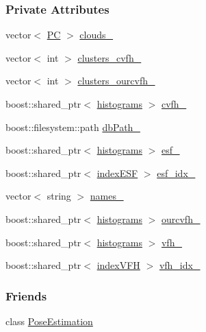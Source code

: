 \subsubsection*{Private Attributes}
\begin{DoxyCompactItemize}
\item 
vector$<$ \hyperlink{group__Definitions_ga62eb21fcfa3189c5de50fb62a2a7a79e}{P\-C} $>$ \hyperlink{classPoseDB_a6c324c00cf5ce2d6370567891170ba68}{clouds\-\_\-}
\item 
vector$<$ int $>$ \hyperlink{classPoseDB_a769672c08a62f8f6fc4fcf5f192e10cd}{clusters\-\_\-cvfh\-\_\-}
\item 
vector$<$ int $>$ \hyperlink{classPoseDB_acad0fbd4acff036f4dad3bfe796d2f1d}{clusters\-\_\-ourcvfh\-\_\-}
\item 
boost\-::shared\-\_\-ptr$<$ \hyperlink{group__Definitions_ga136493056b2eaf642f660e6a45a62991}{histograms} $>$ \hyperlink{classPoseDB_a64f15c76d07faed58d44fa73fe8081f2}{cvfh\-\_\-}
\item 
boost\-::filesystem\-::path \hyperlink{classPoseDB_ad1e3c1001be37bde48faa6502370494b}{db\-Path\-\_\-}
\item 
boost\-::shared\-\_\-ptr$<$ \hyperlink{group__Definitions_ga136493056b2eaf642f660e6a45a62991}{histograms} $>$ \hyperlink{classPoseDB_a658d2785a7e8f59466993864addbeb20}{esf\-\_\-}
\item 
boost\-::shared\-\_\-ptr$<$ \hyperlink{group__Definitions_ga3f45d3216269cf676ea864ae3bfcc446}{index\-E\-S\-F} $>$ \hyperlink{classPoseDB_ae19c149b38112855a937364747edefd5}{esf\-\_\-idx\-\_\-}
\item 
vector$<$ string $>$ \hyperlink{classPoseDB_a2870a93aa6304528109ce29204c95f51}{names\-\_\-}
\item 
boost\-::shared\-\_\-ptr$<$ \hyperlink{group__Definitions_ga136493056b2eaf642f660e6a45a62991}{histograms} $>$ \hyperlink{classPoseDB_a1a7c85d9cb1c33e27abe73f7d61aef6d}{ourcvfh\-\_\-}
\item 
boost\-::shared\-\_\-ptr$<$ \hyperlink{group__Definitions_ga136493056b2eaf642f660e6a45a62991}{histograms} $>$ \hyperlink{classPoseDB_ab0d34fd8b0fc5f74e2b7fc5261fdab8e}{vfh\-\_\-}
\item 
boost\-::shared\-\_\-ptr$<$ \hyperlink{group__Definitions_gacea1a4bf0f6b886a58ff00ff9cb54b34}{index\-V\-F\-H} $>$ \hyperlink{classPoseDB_a166e65f9bf6e0e268ae8e082e43fc242}{vfh\-\_\-idx\-\_\-}
\end{DoxyCompactItemize}
\subsubsection*{Friends}
\begin{DoxyCompactItemize}
\item 
class \hyperlink{classPoseDB_acc93828d970ba58835be2e8221c7a669}{Pose\-Estimation}
\end{DoxyCompactItemize}



